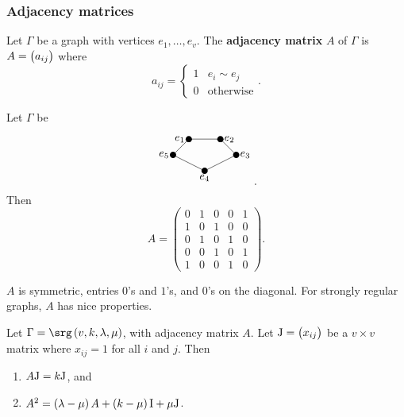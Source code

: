 \pagebreak

\subsubsection{Adjacency matrices}

\begin{definition*}
Let $ \Gamma $ be a graph with vertices $ e_1, \dots, e_v $. The \textbf{adjacency matrix} $ A $ of $ \Gamma $ is $ A = \br{a_{ij}} $ where
$$ a_{ij} =
\begin{cases}
1 & e_i \sim e_j \\
0 & \text{otherwise}
\end{cases}.
$$
\end{definition*}

\begin{example*}
Let $ \Gamma $ be
$$
\begin{tikzpicture}
\fill (0, 0) circle (0.1) node[left]{$ e_1 $};
\fill (1, 0) circle (0.1) node[right]{$ e_2 $};
\fill (-0.5, -0.5) circle (0.1) node[left]{$ e_5 $};
\fill (1.5, -0.5) circle (0.1) node[right]{$ e_3 $};
\fill (0.5, -1) circle (0.1) node[below]{$ e_4 $};
\draw (0, 0) to (1, 0);
\draw (0, 0) to (-0.5, -0.5);
\draw (1, 0) to (1.5, -0.5);
\draw (-0.5, -0.5) to (0.5, -1);
\draw (1.5, -0.5) to (0.5, -1);
\end{tikzpicture}.
$$
Then
$$ A =
\begin{pmatrix}
0 & 1 & 0 & 0 & 1 \\
1 & 0 & 1 & 0 & 0 \\
0 & 1 & 0 & 1 & 0 \\
0 & 0 & 1 & 0 & 1 \\
1 & 0 & 0 & 1 & 0
\end{pmatrix}.
$$
\end{example*}

$ A $ is symmetric, entries $ 0 $'s and $ 1 $'s, and $ 0 $'s on the diagonal. For strongly regular graphs, $ A $ has nice properties.

\begin{proposition}
\label{prop:2.6}
Let $ \Gamma = \srg\br{v, k, \lambda, \mu} $, with adjacency matrix $ A $. Let $ \J = \br{x_{ij}} $ be a $ v \times v $ matrix where $ x_{ij} = 1 $ for all $ i $ and $ j $. Then
\begin{enumerate}
\item $ A\mathrm{J} = k\mathrm{J} $, and
\item $ A^2 = \br{\lambda - \mu}A + \br{k - \mu}\I + \mu\J $.
\end{enumerate}
\end{proposition}

